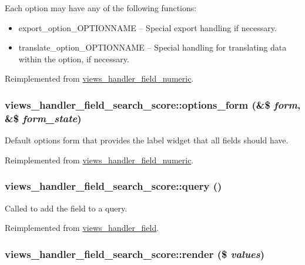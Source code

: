  Each option may have any of the following functions:\begin{itemize}
\item export\_\-option\_\-OPTIONNAME -- Special export handling if necessary.\item translate\_\-option\_\-OPTIONNAME -- Special handling for translating data within the option, if necessary. \end{itemize}


Reimplemented from \hyperlink{classviews__handler__field__numeric_ab74a55c8b3c564ee995e210a503947b}{views\_\-handler\_\-field\_\-numeric}.\hypertarget{classviews__handler__field__search__score_d3bc7dfcc4859869b75b371c33380abb}{
\subsubsection[{options\_\-form}]{\setlength{\rightskip}{0pt plus 5cm}views\_\-handler\_\-field\_\-search\_\-score::options\_\-form (\&\$ {\em form}, \/  \&\$ {\em form\_\-state})}}
\label{classviews__handler__field__search__score_d3bc7dfcc4859869b75b371c33380abb}


Default options form that provides the label widget that all fields should have. 

Reimplemented from \hyperlink{classviews__handler__field__numeric_e6f81d1896ece64e9450ebc2d60da2fd}{views\_\-handler\_\-field\_\-numeric}.\hypertarget{classviews__handler__field__search__score_fda75fb726345ee91401d2f79ad2d313}{
\subsubsection[{query}]{\setlength{\rightskip}{0pt plus 5cm}views\_\-handler\_\-field\_\-search\_\-score::query ()}}
\label{classviews__handler__field__search__score_fda75fb726345ee91401d2f79ad2d313}


Called to add the field to a query. 

Reimplemented from \hyperlink{classviews__handler__field_4f661f91bcbe80d4a00c30a31456c502}{views\_\-handler\_\-field}.\hypertarget{classviews__handler__field__search__score_80a58d69b8a6c7f57da022e88f90e32d}{
\subsubsection[{render}]{\setlength{\rightskip}{0pt plus 5cm}views\_\-handler\_\-field\_\-search\_\-score::render (\$ {\em values})}}
\label{classviews__handler__field__search__score_80a58d69b8a6c7f57da022e88f90e32d}


